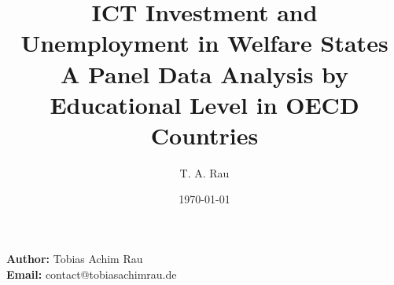 \documentclass[a4paper, 12pt]{article}
\title{ICT Investment and Unemployment in Welfare States \\
\large A Panel Data Analysis by Educational Level in OECD Countries}
\author{T. A. Rau}
\date{\today}
\begin{document}
\maketitle
\thispagestyle{empty}
\vspace{15cm}

\begin{center}
  \textbf{Author:} Tobias Achim Rau \\
  \textbf{Email:} contact@tobiasachimrau.de \\
\end{center}

\newpage

\setcounter{page}{1}

\tableofcontents

\newpage

\setcounter{page}{1}









\renewcommand{\bibfont}{\small}
\printbibliography
\end{document}
